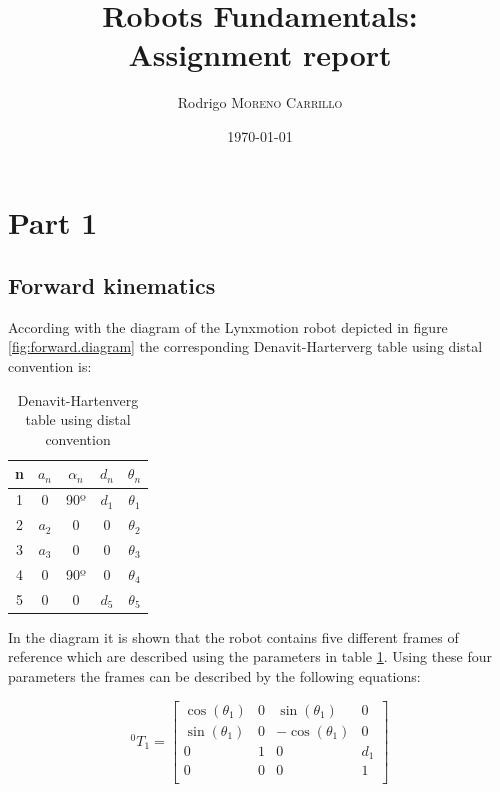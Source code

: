 \documentclass{article}
\title{Robots Fundamentals:\\
Assignment report} %
\author{Rodrigo \textsc{Moreno Carrillo}} %
\date{\today} %
\renewcommand{\c}[1]{\cos(\theta_{#1})}
\newcommand{\s}[1]{\sin(\theta_{#1})}
\newcommand{\T}[2]{{}^{#1}T_{#2}}
\begin{document}

\maketitle %

\section{Part 1}
\subsection{Forward kinematics} 

According with the diagram of the Lynxmotion robot depicted in figure \ref{fig:forward.diagram} the corresponding Denavit-Harterverg table using distal convention is:

\begin{table}[h!]
\centering
\begin{tabular}{ c | c c c c}
 n & $a_n$ 	& $\alpha_n$		& $d_n$	& $\theta_n$\\ \hline
 1 & 0 			& 90º				& $d_1$	& $\theta_1$\\  
 2 & $a_2$ 	& 0					& 0			& $\theta_2$\\  
 3 & $a_3$ 	& 0					& 0			& $\theta_3$\\  
 4 & 0 			& 90º				& 0			& $\theta_4$\\  
 5 & 0 			& 0					& $d_5$	& $\theta_5$\\ 
\end{tabular}
\caption{Denavit-Hartenverg table using distal convention}
\label{tab:forward.dh}
\end{table}

In the diagram it is shown that the robot contains five different frames of reference which are described using the parameters in table \ref{tab:forward.dh}. Using these four parameters the frames can be described by the following equations:

\begin{equation}
\label{eq:forward.t_01}
\T{0}{1} = \left[
\begin{array}{cccc}
	\c{1} & 0 & \s{1} & 0 \\
	\s{1} & 0 & -\c{1} & 0 \\
	0 & 1 & 0 & d_1 \\
	0 & 0 & 0 & 1 \\
\end{array}
\right]
\end{equation}
\end{document}
